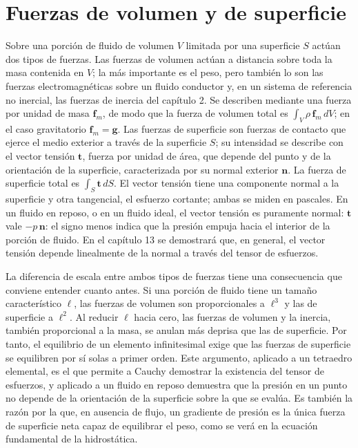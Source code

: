 \documentclass[10pt,openany]{book}
\begin{document}
\section{Fuerzas de volumen y de superficie}

Sobre una porción de fluido de volumen \(V\) limitada por una superficie \(S\) actúan dos tipos de fuerzas. Las fuerzas de volumen actúan a distancia sobre toda la masa contenida en \(V\); la más importante es el peso, pero también lo son las fuerzas electromagnéticas sobre un fluido conductor y, en un sistema de referencia no inercial, las fuerzas de inercia del capítulo 2. Se describen mediante una fuerza por unidad de masa \(\mathbf{f}_m\), de modo que la fuerza de volumen total es \(\int_V \rho\,\mathbf{f}_m\,dV\); en el caso gravitatorio \(\mathbf{f}_m = \mathbf{g}\). Las fuerzas de superficie son fuerzas de contacto que ejerce el medio exterior a través de la superficie \(S\); su intensidad se describe con el vector tensión \(\mathbf{t}\), fuerza por unidad de área, que depende del punto y de la orientación de la superficie, caracterizada por su normal exterior \(\mathbf{n}\). La fuerza de superficie total es \(\int_S \mathbf{t}\,dS\). El vector tensión tiene una componente normal a la superficie y otra tangencial, el esfuerzo cortante; ambas se miden en pascales. En un fluido en reposo, o en un fluido ideal, el vector tensión es puramente normal: \(\mathbf{t}\) vale \(-p\,\mathbf{n}\): el signo menos indica que la presión empuja hacia el interior de la porción de fluido. En el capítulo 13 se demostrará que, en general, el vector tensión depende linealmente de la normal a través del tensor de esfuerzos.

La diferencia de escala entre ambos tipos de fuerzas tiene una consecuencia que conviene entender cuanto antes. Si una porción de fluido tiene un tamaño característico \(\ell\), las fuerzas de volumen son proporcionales a \(\ell^{3}\) y las de superficie a \(\ell^{2}\). Al reducir \(\ell\) hacia cero, las fuerzas de volumen y la inercia, también proporcional a la masa, se anulan más deprisa que las de superficie. Por tanto, el equilibrio de un elemento infinitesimal exige que las fuerzas de superficie se equilibren por sí solas a primer orden. Este argumento, aplicado a un tetraedro elemental, es el que permite a Cauchy demostrar la existencia del tensor de esfuerzos, y aplicado a un fluido en reposo demuestra que la presión en un punto no depende de la orientación de la superficie sobre la que se evalúa. Es también la razón por la que, en ausencia de flujo, un gradiente de presión es la única fuerza de superficie neta capaz de equilibrar el peso, como se verá en la ecuación fundamental de la hidrostática.
\end{document}
